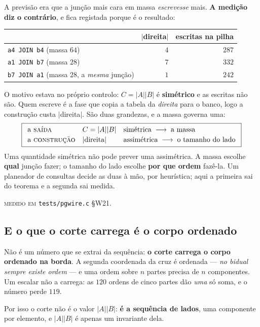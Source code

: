 \documentclass[11pt,a4paper]{article}
\newcommand{\code}[1]{\texttt{\small #1}}
\begin{document}
A previsão era que a junção mais cara em massa \emph{escrevesse} mais. \textbf{A medição diz o
contrário}, e fica registada porque é o resultado:

\begin{center}\small
\begin{tabular}{@{}lrr@{}}
\toprule
& $|$direita$|$ & escritas na pilha \\
\midrule
\code{a4 JOIN b4} (massa $64$) & $4$ & $287$ \\
\code{a1 JOIN b7} (massa $28$) & $7$ & $332$ \\
\code{b7 JOIN a1} (massa $28$, a \emph{mesma} junção) & $1$ & $242$ \\
\bottomrule
\end{tabular}
\end{center}

\noindent O motivo estava no próprio controlo: $C=|A||B|$ é \textbf{simétrico} e as escritas não
são. Quem escreve é a fase que copia a tabela da \emph{direita} para o banco, logo a construção
custa $|$direita$|$. São duas grandezas, e a massa governa uma:
\[
\boxed{
\begin{array}{lll}
\text{a \textsc{saída}} & C=|A||B| & \text{simétrica} \;\longrightarrow\; \text{a massa} \\[0.2em]
\text{a \textsc{construção}} & |\text{direita}| & \text{assimétrica} \;\longrightarrow\; \text{o tamanho do lado}
\end{array}}
\]
Uma quantidade simétrica não pode prever uma assimétrica. A massa escolhe \textbf{qual} junção
fazer; o tamanho do lado escolhe \textbf{por que ordem} fazê-la. Um planeador de consultas decide
as duas à mão, por heurística; aqui a primeira sai do teorema e a segunda sai medida.

\medskip
\noindent \textsc{medido em} \code{tests/pgwire.c} §W21.

\subsection*{E o que o corte carrega é o corpo ordenado}

Não é um número que se extrai da sequência: \textbf{o corte carrega o corpo ordenado na borda}. A
segunda coordenada da cruz é ordenada --- \emph{no bidual sempre existe ordem} --- e uma ordem sobre
$n$ partes precisa de $n$ componentes. Um escalar não a carrega: as $120$ ordens de cinco partes dão
\emph{uma} só soma, e o número perde $119$.

\smallskip
\noindent Por isso o corte não é o valor $|A||B|$: \textbf{é a sequência de lados}, uma componente
por elemento, e $|A||B|$ é apenas um invariante dela.
\end{document}
